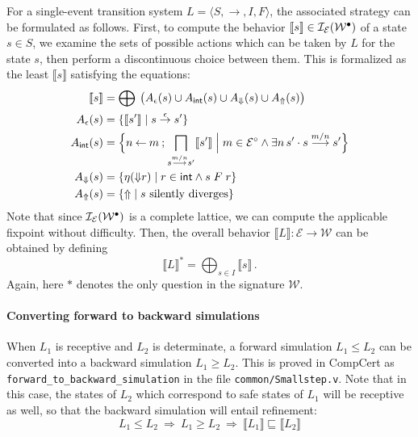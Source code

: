 \documentclass[acmsmall,review,anonymous]{acmart}\settopmatter{printfolios=true,printccs=false,printacmref=false}
\newcommand{\bdot}{\cdot}
\begin{document}
For a single-event transition system
$L = \langle S, {\rightarrow}, I, F \rangle$,
the associated strategy
can be formulated as follows.
First,
to compute the behavior
$\llbracket s \rrbracket \in \mathcal{I}_\mathcal{E}(\mathcal{W}^\bullet)$
of a state $s \in S$,
we examine the sets of possible actions
which can be taken by $L$
for the state $s$,
then perform a discontinuous choice between them.
This is formalized as the least $\llbracket s \rrbracket$
satisfying the equations:
\begin{align*}
  \llbracket s \rrbracket &=
    \bigoplus \:
    \big(
      A_\epsilon(s) \cup A_\kw{int}(s) \cup
      A_\Downarrow(s) \cup A_\Uparrow(s)
    \big)
  \\
  A_\epsilon(s) &=
    \{ \llbracket s' \rrbracket \mid s \stackrel{\epsilon}{\rightarrow} s' \}
  \\
  A_\kw{int}(s) &=
    \Big\{
      n \mathbin\leftarrow m \mathbin;
      \bigsqcap_{s \stackrel{m/n}{\longrightarrow} s'}
	\llbracket s' \rrbracket
    \mathrel{\Big\vert}
      m \in \mathcal{E}^\que \wedge
      \exists n \, s' \bdot s \stackrel{m/n}{\longrightarrow} s'
    \Big\}
  \\
  A_\Downarrow(s) &=
    \{ \eta({\Downarrow} r) \mid r \in \kw{int} \wedge s \mathrel{F} r \}
  \\
  A_\Uparrow(s) &=
    \{ {\Uparrow} \mid s \text{ silently diverges} \}
\end{align*}
Note that since $\mathcal{I}_\mathcal{E}(\mathcal{W}^\bullet)$
is a complete lattice,
we can compute the applicable fixpoint without difficulty.
Then,
the overall behavior
$\llbracket L \rrbracket : \mathcal{E} \rightarrow \mathcal{W}$
can be obtained by defining
\[
  \llbracket L \rrbracket^* = \bigoplus_{s \in I} \llbracket s \rrbracket
  \,.
\]
Again, here $*$ denotes the only question in the signature $\mathcal{W}$.

\paragraph{Converting forward to backward simulations}

When $L_1$ is receptive and $L_2$ is determinate,
a forward simulation $L_1 \le L_2$ can be converted
into a backward simulation $L_1 \ge L_2$.
This is proved in CompCert
as \texttt{forward\_to\_backward\_simulation}
in the file \texttt{common/Smallstep.v}.
Note that in this case,
the states of $L_2$ which correspond
to safe states of $L_1$ will be receptive as well,
so that the backward simulation will entail refinement:
\[
  L_1 \le L_2 \: \Rightarrow \:
  L_1 \ge L_2 \: \Rightarrow \:
  \llbracket L_1 \rrbracket \sqsubseteq \llbracket L_2 \rrbracket
\]
\end{document}

